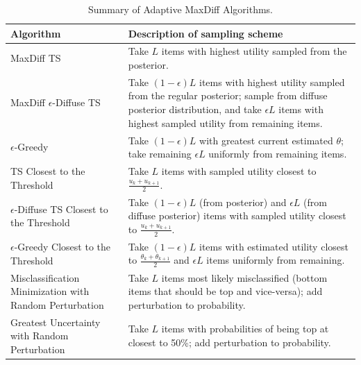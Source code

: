 \documentclass[a4paper,11pt]{article}
\newcommand{\numperset}{L}
\begin{document}
\begin{table}
\begin{tabular}{p{3in}|p{3in}}
Algorithm & Description of sampling scheme \\
\hline
MaxDiff TS & Take $\numperset$ items with highest utility sampled from the posterior.\\
MaxDiff $\epsilon$-Diffuse TS & Take $(1-\epsilon)L$ items with highest utility sampled from the regular posterior; sample from diffuse posterior distribution, and take $\epsilon L$ items with highest sampled utility from remaining items.\\
$\epsilon$-Greedy & Take $(1-\epsilon)L$ with greatest current estimated $\theta$; take remaining $\epsilon L$ uniformly from remaining items.\\
TS Closest to the Threshold & Take $\numperset$ items with sampled utility closest to $\frac{u_k+u_{k+1}}{2}$.\\
$\epsilon$-Diffuse TS Closest to the Threshold & Take $(1-\epsilon)L$ (from posterior) and  $\epsilon L$ (from diffuse posterior) items with sampled utility closest to $\frac{u_k+u_{k+1}}{2}$.\\
$\epsilon$-Greedy Closest to the Threshold & Take $(1-\epsilon)L$ items with estimated utility closest to $\frac{\theta_k+\theta_{k+1}}{2}$ and $\epsilon L$ items uniformly from remaining.\\
Misclassification Minimization with Random Perturbation& Take $\numperset$ items most likely misclassified (bottom items that should be top and vice-versa); add perturbation to probability.\\
Greatest Uncertainty with Random Perturbation& Take $\numperset$ items with probabilities of being top at closest to 50\%; add perturbation to probability.\\
\end{tabular}
\caption{Summary of Adaptive MaxDiff Algorithms.}\label{methods}
\end{table}




\end{document}
